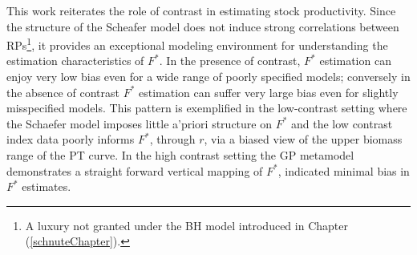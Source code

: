 This work reiterates the role of contrast 
\cite{hilborn_quantitative_1992} in estimating stock productivity. 
Since the structure of the Scheafer model does not induce strong correlations
between RPs\footnote{A luxury not granted under the BH model introduced
in Chapter (\ref{schnuteChapter}).}, it provides an exceptional modeling 
environment for understanding the estimation characteristics of $F^*$. In the 
presence of contrast, $F^*$ estimation can enjoy very low bias even for a wide 
range of poorly specified models; conversely in the absence of contrast $F^*$ 
estimation can suffer very large bias even for slightly misspecified models.
This pattern is exemplified in the low-contrast setting where the Schaefer 
model imposes little a'priori structure on $F^*$ and the low contrast index 
data poorly informs $F^*$, through $r$, via a biased view of the upper biomass 
range of the PT curve.
In the high contrast setting the GP metamodel demonstrates a straight forward 
vertical mapping of $F^*$, indicated minimal bias in $F^*$ estimates.

%

